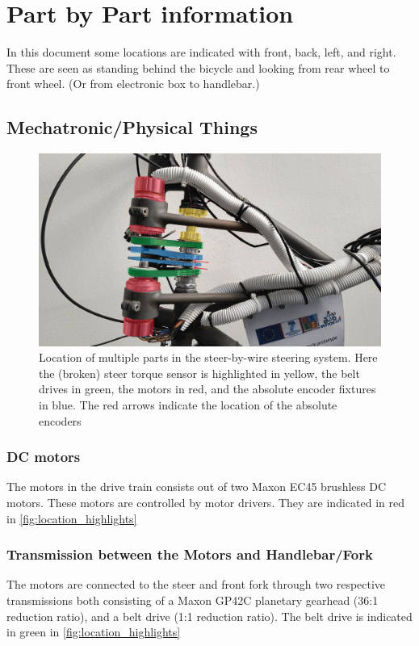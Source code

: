 \section{Part by Part information}
In this document some locations are indicated with front, back, left, and right. These are seen as standing behind the bicycle and looking from rear wheel to front wheel. (Or from electronic box to handlebar.)

\subsection{Mechatronic/Physical Things}
\begin{figure}
    \centering
    \includegraphics[width=\textwidth]{Img/highlight_locations.jpg}
    \caption{Location of multiple parts in the steer-by-wire steering system. Here the (broken) steer torque sensor is highlighted in yellow, the belt drives in green, the motors in red, and the absolute encoder fixtures in blue. The red arrows indicate the location of the absolute encoders}
    \label{fig:location_highlights}
\end{figure}

\subsubsection{DC motors}
The motors in the drive train consists out of two Maxon EC45 brushless DC motors.
These motors are controlled by motor drivers.
They are indicated in red in \autoref{fig:location_highlights}

\subsubsection{Transmission between the Motors and Handlebar/Fork}
The motors are connected to the steer and front fork through two respective transmissions both consisting of a Maxon GP42C planetary gearhead (36:1 reduction ratio), and a belt drive (1:1 reduction ratio). The belt drive is indicated in green in \autoref{fig:location_highlights}

